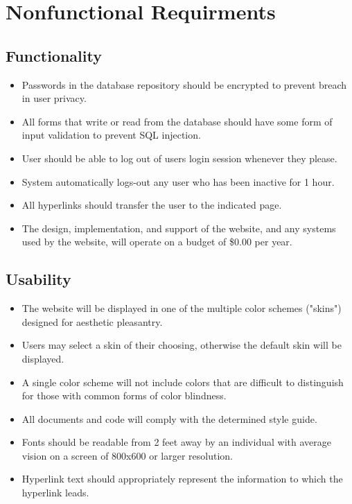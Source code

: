 %

\section{Nonfunctional Requirments}

	\subsection{Functionality}
	\begin{itemize}
		\item Passwords in the database repository should be encrypted to prevent breach in user privacy.
		\item All forms that write or read from the database should have some form of input validation to prevent SQL injection.
		\item User should be able to log out of users login session whenever they please.
		\item System automatically logs-out any user who has been inactive for 1 hour.
		\item All hyperlinks should transfer the user to the indicated page.
		\item The design, implementation, and support of the website, and any systems used by the website, will operate on a budget of \$0.00 per year.
	\end{itemize}
	
	\subsection{Usability}
	\begin{itemize}
		\item The website will be displayed in one of the multiple color schemes ("skins") designed for aesthetic pleasantry.
		\item Users may select a skin of their choosing, otherwise the default skin will be displayed.
		\item A single color scheme will not include colors that are difficult to distinguish for those with common forms of color blindness.
		\item All documents and code will comply with the determined style guide.
		\item Fonts should be readable from 2 feet away by an individual with average vision on a screen of 800x600 or larger resolution.
		\item Hyperlink text should appropriately represent the information to which the hyperlink leads.
	\end{itemize}
	
